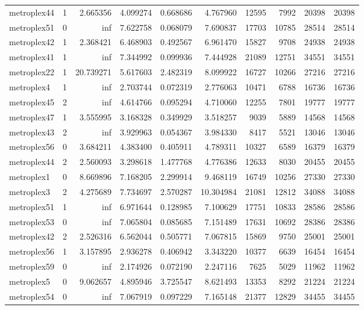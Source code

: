 \begin{longtable}{|l|r|r|r|r|r|r|r|r|r|}
metroplex44 & 1 & 2.665356 & 4.099274 & 0.668686 & 4.767960 & 12595 & 7992 & 20398 & 20398 \\
metroplex51 & 0 & inf & 7.622758 & 0.068079 & 7.690837 & 17703 & 10785 & 28514 & 28514 \\
metroplex42 & 1 & 2.368421 & 6.468903 & 0.492567 & 6.961470 & 15827 & 9708 & 24938 & 24938 \\
metroplex41 & 1 & inf & 7.344992 & 0.099936 & 7.444928 & 21089 & 12751 & 34551 & 34551 \\
metroplex22 & 1 & 20.739271 & 5.617603 & 2.482319 & 8.099922 & 16727 & 10266 & 27216 & 27216 \\
metroplex4 & 1 & inf & 2.703744 & 0.072319 & 2.776063 & 10471 & 6788 & 16736 & 16736 \\
metroplex45 & 2 & inf & 4.614766 & 0.095294 & 4.710060 & 12255 & 7801 & 19777 & 19777 \\
metroplex47 & 1 & 3.555995 & 3.168328 & 0.349929 & 3.518257 & 9039 & 5889 & 14568 & 14568 \\
metroplex43 & 2 & inf & 3.929963 & 0.054367 & 3.984330 & 8417 & 5521 & 13046 & 13046 \\
metroplex56 & 0 & 3.684211 & 4.383400 & 0.405911 & 4.789311 & 10327 & 6589 & 16379 & 16379 \\
metroplex44 & 2 & 2.560093 & 3.298618 & 1.477768 & 4.776386 & 12633 & 8030 & 20455 & 20455 \\
metroplex1 & 0 & 8.669896 & 7.168205 & 2.299914 & 9.468119 & 16749 & 10256 & 27330 & 27330 \\
metroplex3 & 2 & 4.275689 & 7.734697 & 2.570287 & 10.304984 & 21081 & 12812 & 34088 & 34088 \\
metroplex51 & 1 & inf & 6.971644 & 0.128985 & 7.100629 & 17751 & 10833 & 28586 & 28586 \\
metroplex53 & 0 & inf & 7.065804 & 0.085685 & 7.151489 & 17631 & 10692 & 28386 & 28386 \\
metroplex42 & 2 & 2.526316 & 6.562044 & 0.505771 & 7.067815 & 15869 & 9750 & 25001 & 25001 \\
metroplex56 & 1 & 3.157895 & 2.936278 & 0.406942 & 3.343220 & 10377 & 6639 & 16454 & 16454 \\
metroplex59 & 0 & inf & 2.174926 & 0.072190 & 2.247116 & 7625 & 5029 & 11962 & 11962 \\
metroplex5 & 0 & 9.062657 & 4.895946 & 3.725547 & 8.621493 & 13353 & 8292 & 21224 & 21224 \\
metroplex54 & 0 & inf & 7.067919 & 0.097229 & 7.165148 & 21377 & 12829 & 34455 & 34455 \\

\end{longtable}
